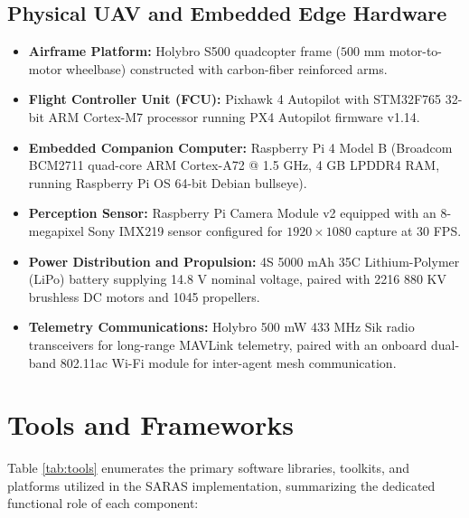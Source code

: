\subsection{Physical UAV and Embedded Edge Hardware}
\begin{itemize}
    \item \textbf{Airframe Platform:} Holybro S500 quadcopter frame ($500\text{ mm}$ motor-to-motor wheelbase) constructed with carbon-fiber reinforced arms.
    \item \textbf{Flight Controller Unit (FCU):} Pixhawk 4 Autopilot with STM32F765 32-bit ARM Cortex-M7 processor running PX4 Autopilot firmware v1.14.
    \item \textbf{Embedded Companion Computer:} Raspberry Pi 4 Model B (Broadcom BCM2711 quad-core ARM Cortex-A72 @ 1.5 GHz, 4 GB LPDDR4 RAM, running Raspberry Pi OS 64-bit Debian bullseye).
    \item \textbf{Perception Sensor:} Raspberry Pi Camera Module v2 equipped with an 8-megapixel Sony IMX219 sensor configured for $1920 \times 1080$ capture at 30 FPS.
    \item \textbf{Power Distribution and Propulsion:} 4S 5000 mAh 35C Lithium-Polymer (LiPo) battery supplying 14.8 V nominal voltage, paired with 2216 880 KV brushless DC motors and 1045 propellers.
    \item \textbf{Telemetry Communications:} Holybro 500 mW 433 MHz Sik radio transceivers for long-range MAVLink telemetry, paired with an onboard dual-band 802.11ac Wi-Fi module for inter-agent mesh communication.
\end{itemize}

\section{Tools and Frameworks}

Table \ref{tab:tools} enumerates the primary software libraries, toolkits, and platforms utilized in the SARAS implementation, summarizing the dedicated functional role of each component:

